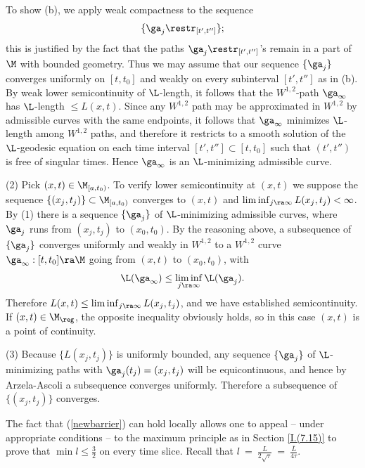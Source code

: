 To show (b),  we apply weak compactness to the sequence
\begin{equation}
\{\ga_j\restr_{[t',t'']}\};
\end{equation}
\noindent
this is justified by the fact that  the paths $\ga_j\restr_{[t',t'']}$'s remain in a part
of $\M$ with  bounded geometry.  Thus we may assume that our sequence $\{\ga_j\}$
converges uniformly on $[t,t_0]$ and weakly on every subinterval $[t',t'']$ as in (b).
By weak lower semicontinuity of $\L$-length, it follows that the $W^{1,2}$-path
$\ga_\infty$ has $\L$-length $\leq L(x,t)$.  Since any $W^{1,2}$ path  may be approximated
in $W^{1,2}$ by  admissible curves with the same endpoints, it follows that $\ga_\infty$
 minimizes $\L$-length among $W^{1,2}$ paths, and therefore
it restricts to a smooth solution of the $\L$-geodesic equation on each time
interval $[t',t'']\subset [t,t_0]$ such that $(t',t'')$ is free of singular times.
Hence $\ga_\infty$ is an $\L$-minimizing admissible curve.

(2) Pick $(x,t)\in\M_{[a,t_0)}$.  To verify lower semicontinuity at
$(x,t)$ we suppose the sequence $\{(x_j,t_j)\}\subset \M_{[a,t_0)}$
converges to $(x,t)$
and $\liminf_{j\ra\infty}L(x_j,t_j)<\infty$.   By (1) there is a sequence
$\{\ga_j\}$ of $\L$-minimizing admissible curves, where
$\ga_j$ runs from $(x_j,t_j)$ to $(x_0,t_0)$.  By the reasoning above,
a subsequence of $\{\ga_j\}$ converges uniformly and weakly in $W^{1,2}$ to a $W^{1,2}$
curve $\ga_\infty:[t,t_0]\ra\M$ going from $(x,t)$ to $(x_0,t_0)$, with
\begin{equation}
\L(\ga_\infty)\leq \liminf_{j\ra\infty}\L(\ga_j).
\end{equation}
Therefore $L(x,t)\leq \liminf_{j\ra\infty} L(x_j,t_j)$, and we have established
semicontinuity.  If
$(x,t)\in \M_{\reg}$,
the opposite inequality obviously
holds, so in this case $(x,t)$ is a point of continuity.

(3) Because $\{L(x_j,t_j)\}$ is uniformly bounded,  any sequence $\{\ga_j\}$ of $\L$-minimizing
paths with $\ga_j(t_j)=(x_j,t_j)$ will be equicontinuous, and hence by Arzela-Ascoli
a subsequence converges uniformly.  Therefore a subsequence of $\{(x_j,t_j)\}$ converges.
\endgroup\par\medskip

The fact that (\ref{newbarrier}) can hold locally allows one
to appeal -- under appropriate conditions -- to the maximum
principle as in Section \ref{I.(7.15)} to prove
that $\min l\leq \frac{3}{2}$ on
every time slice.
Recall that $l \: = \: \frac{L}{2\sqrt{\tau}} \: = \:
\frac{\overline{L}}{4\tau}$.


